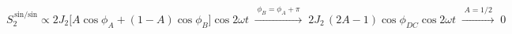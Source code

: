 \documentclass[border=1pt]{standalone}
\begin{document}
\fontsize{14}{16.8}\selectfont
\(\displaystyle S_2^{\,\mathrm{sin/sin}} \propto 2J_2\bigl[A\cos\phi_A + (1-A)\cos\phi_B\bigr]\cos 2\omega t \;\xrightarrow{\;\phi_B=\phi_A+\pi\;}\; 2J_2\,(2A-1)\cos\phi_{DC}\cos 2\omega t \;\xrightarrow{\;A=1/2\;}\; 0\)
\end{document}
